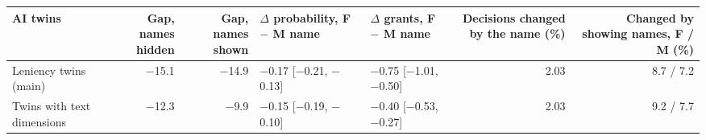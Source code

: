 \begin{tabular}{lrrllrr}
\toprule
AI twins & Gap, names hidden & Gap, names shown & $\Delta$ probability, F $-$ M name & $\Delta$ grants, F $-$ M name & Decisions changed by the name (\%) & Changed by showing names, F / M (\%) \\
\midrule
Leniency twins (main) & $-$15.1 & $-$14.9 & $-$0.17 [$-$0.21, $-$0.13] & $-$0.75 [$-$1.01, $-$0.50] & 2.03 & 8.7 / 7.2 \\
Twins with text dimensions & $-$12.3 & $-$9.9 & $-$0.15 [$-$0.19, $-$0.10] & $-$0.40 [$-$0.53, $-$0.27] & 2.03 & 9.2 / 7.7 \\
\bottomrule
\end{tabular}
